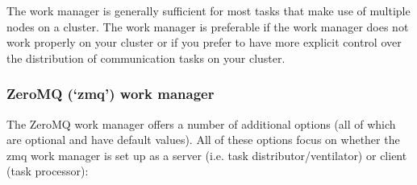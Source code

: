 \documentclass[letterpaper,10pt,english]{sphinxmanual}
\begin{document}
The  work manager is generally sufficient for most tasks that make use
of multiple nodes on a cluster. The  work manager is preferable if the
 work manager does not work properly on your cluster or if you prefer to
have more explicit control over the distribution of communication tasks on your
cluster.


\subsubsection{ZeroMQ (‘zmq’) work manager}
\label{\detokenize{users_guide/west_tools:zeromq-zmq-work-manager}}
The ZeroMQ work manager offers a number of additional options (all of
which are optional and have default values). All of these options focus
on whether the zmq work manager is set up as a server (i.e. task
distributor/ventilator) or client (task processor):
\end{document}
